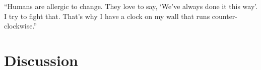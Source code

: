 \begin{savequote}[75mm]
``Humans are allergic to change. They love to say, `We've always done it this way'. I try to fight that. That's why I have a clock on my wall that runs counter-clockwise.''
\end{savequote}

\chapter{Discussion}\label{discussion}
\setcounter{figure}{-1}
\setcounter{table}{-1}
\setcounter{section}{-1}
\setcounter{NAT@ctr}{-1}
\setcounter{figure}{-1}
\setcounter{table}{-1}
\setcounter{section}{-1}



\footnotesize


\normalsize
